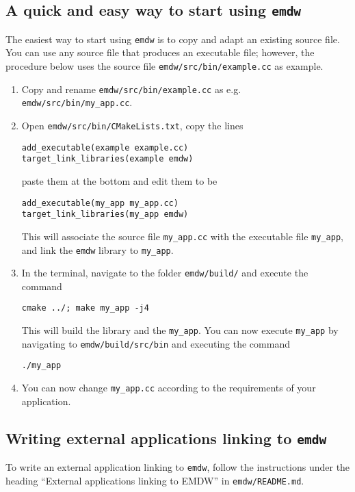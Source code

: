 \documentclass[english]{article}
\begin{document}
\subsection{A quick and easy way to start using \texttt{emdw}}
The easiest way to start using \texttt{emdw} is to copy and adapt an
existing source file.  You can use any source file that produces an
executable file; however, the procedure below uses the source file
\texttt{emdw/src/bin/example.cc} as example.
\begin{enumerate}
\item Copy and rename \texttt{emdw/src/bin/example.cc} as
  e.g. \texttt{emdw/src/bin/my\_app.cc}.
\item Open \texttt{emdw/src/bin/CMakeLists.txt}, copy the lines
\begin{verbatim}
add_executable(example example.cc)
target_link_libraries(example emdw)
\end{verbatim}
  paste them at the bottom and edit them to be
\begin{verbatim}
add_executable(my_app my_app.cc)
target_link_libraries(my_app emdw)
\end{verbatim}
  This will associate the source file \texttt{my\_app.cc} with the
  executable file \texttt{my\_app}, and link the \texttt{emdw} library
  to \texttt{my\_app}.
\item In the terminal, navigate to the folder \texttt{emdw/build/} and
  execute the command
\begin{verbatim}
cmake ../; make my_app -j4
\end{verbatim}
This will build the library and the \texttt{my\_app}.  You can now
execute \texttt{my\_app} by navigating to \texttt{emdw/build/src/bin}
and executing the command
\begin{verbatim}
./my_app
\end{verbatim}
\item You can now change \texttt{my\_app.cc} according to the
  requirements of your application.

\end{enumerate}

\subsection{Writing external applications linking to \texttt{emdw}}
To write an external application linking to \texttt{emdw}, follow the
instructions under the heading ``External applications linking to
EMDW'' in \texttt{emdw/README.md}.
\end{document}
